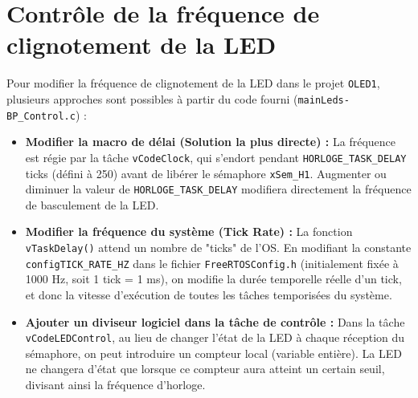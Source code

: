 \section{Contrôle de la fréquence de clignotement de la LED}

Pour modifier la fréquence de clignotement de la LED dans le projet \verb|OLED1|, plusieurs approches sont possibles à partir du code fourni (\verb|mainLeds-BP_Control.c|) :

\begin{itemize}
    \item \textbf{Modifier la macro de délai (Solution la plus directe) :} La fréquence est régie par la tâche \verb|vCodeClock|, qui s'endort pendant \verb|HORLOGE_TASK_DELAY| ticks (défini à 250) avant de libérer le sémaphore \verb|xSem_H1|. Augmenter ou diminuer la valeur de \verb|HORLOGE_TASK_DELAY| modifiera directement la fréquence de basculement de la LED. \\
    
    \item \textbf{Modifier la fréquence du système (Tick Rate) :} La fonction \verb|vTaskDelay()| attend un nombre de "ticks" de l'OS. En modifiant la constante \verb|configTICK_RATE_HZ| dans le fichier \verb|FreeRTOSConfig.h| (initialement fixée à 1000 Hz, soit 1 tick = 1 ms), on modifie la durée temporelle réelle d'un tick, et donc la vitesse d'exécution de toutes les tâches temporisées du système. \\
    
    \item \textbf{Ajouter un diviseur logiciel dans la tâche de contrôle :} Dans la tâche \verb|vCodeLEDControl|, au lieu de changer l'état de la LED à chaque réception du sémaphore, on peut introduire un compteur local (variable entière). La LED ne changera d'état que lorsque ce compteur aura atteint un certain seuil, divisant ainsi la fréquence d'horloge.
\end{itemize}